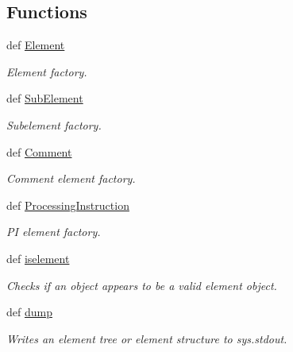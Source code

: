 \subsection*{Functions}
\begin{DoxyCompactItemize}
\item 
def \hyperlink{namespacePyQt-x11-gpl-4_811_82_1_1elementtree_1_1ElementTree_a0144f68b4594417eaaf4ed282f9106db}{Element}
\begin{DoxyCompactList}\small\item\em Element factory. \end{DoxyCompactList}\item 
def \hyperlink{namespacePyQt-x11-gpl-4_811_82_1_1elementtree_1_1ElementTree_a782e0576bbdc231d6ca3b0bbaf908ea8}{Sub\+Element}
\begin{DoxyCompactList}\small\item\em Subelement factory. \end{DoxyCompactList}\item 
def \hyperlink{namespacePyQt-x11-gpl-4_811_82_1_1elementtree_1_1ElementTree_ae148c00f5ee7597abc424c8cecb66cfc}{Comment}
\begin{DoxyCompactList}\small\item\em Comment element factory. \end{DoxyCompactList}\item 
def \hyperlink{namespacePyQt-x11-gpl-4_811_82_1_1elementtree_1_1ElementTree_a67d91b8c5e5e849edcc3bb4660f423a8}{Processing\+Instruction}
\begin{DoxyCompactList}\small\item\em P\+I element factory. \end{DoxyCompactList}\item 
def \hyperlink{namespacePyQt-x11-gpl-4_811_82_1_1elementtree_1_1ElementTree_ab6ca371b53ccbd1e243e46ae5bef5115}{iselement}
\begin{DoxyCompactList}\small\item\em Checks if an object appears to be a valid element object. \end{DoxyCompactList}\item 
def \hyperlink{namespacePyQt-x11-gpl-4_811_82_1_1elementtree_1_1ElementTree_a58e74cf2460703a087fb282c18a537b0}{dump}
\begin{DoxyCompactList}\small\item\em Writes an element tree or element structure to sys.\+stdout. \end{DoxyCompactList}\end{DoxyCompactItemize}
